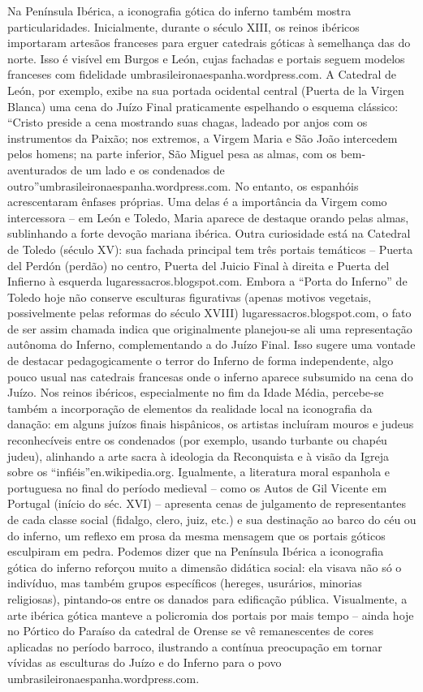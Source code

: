 Na Península Ibérica, a iconografia gótica do inferno também mostra particularidades. Inicialmente, durante o século XIII, os reinos ibéricos importaram artesãos franceses para erguer catedrais góticas à semelhança das do norte. Isso é visível em Burgos e León, cujas fachadas e portais seguem modelos franceses com fidelidade umbrasileironaespanha.wordpress.com. A Catedral de León, por exemplo, exibe na sua portada ocidental central (Puerta de la Virgen Blanca) uma cena do Juízo Final praticamente espelhando o esquema clássico: “Cristo preside a cena mostrando suas chagas, ladeado por anjos com os instrumentos da Paixão; nos extremos, a Virgem Maria e São João intercedem pelos homens; na parte inferior, São Miguel pesa as almas, com os bem-aventurados de um lado e os condenados de outro”umbrasileironaespanha.wordpress.com. No entanto, os espanhóis acrescentaram ênfases próprias. Uma delas é a importância da Virgem como intercessora -- em León e Toledo, Maria aparece de destaque orando pelas almas, sublinhando a forte devoção mariana ibérica. Outra curiosidade está na Catedral de Toledo (século XV): sua fachada principal tem três portais temáticos -- Puerta del Perdón (perdão) no centro, Puerta del Juicio Final à direita e Puerta del Infierno à esquerda lugaressacros.blogspot.com. Embora a “Porta do Inferno” de Toledo hoje não conserve esculturas figurativas (apenas motivos vegetais, possivelmente pelas reformas do século XVIII) lugaressacros.blogspot.com, o fato de ser assim chamada indica que originalmente planejou-se ali uma representação autônoma do Inferno, complementando a do Juízo Final. Isso sugere uma vontade de destacar pedagogicamente o terror do Inferno de forma independente, algo pouco usual nas catedrais francesas onde o inferno aparece subsumido na cena do Juízo. Nos reinos ibéricos, especialmente no fim da Idade Média, percebe-se também a incorporação de elementos da realidade local na iconografia da danação: em alguns juízos finais hispânicos, os artistas incluíram mouros e judeus reconhecíveis entre os condenados (por exemplo, usando turbante ou chapéu judeu), alinhando a arte sacra à ideologia da Reconquista e à visão da Igreja sobre os “infiéis”en.wikipedia.org. Igualmente, a literatura moral espanhola e portuguesa no final do período medieval -- como os Autos de Gil Vicente em Portugal (início do séc. XVI) -- apresenta cenas de julgamento de representantes de cada classe social (fidalgo, clero, juiz, etc.) e sua destinação ao barco do céu ou do inferno, um reflexo em prosa da mesma mensagem que os portais góticos esculpiram em pedra. Podemos dizer que na Península Ibérica a iconografia gótica do inferno reforçou muito a dimensão didática social: ela visava não só o indivíduo, mas também grupos específicos (hereges, usurários, minorias religiosas), pintando-os entre os danados para edificação pública. Visualmente, a arte ibérica gótica manteve a policromia dos portais por mais tempo -- ainda hoje no Pórtico do Paraíso da catedral de Orense se vê remanescentes de cores aplicadas no período barroco, ilustrando a contínua preocupação em tornar vívidas as esculturas do Juízo e do Inferno para o povo umbrasileironaespanha.wordpress.com.

